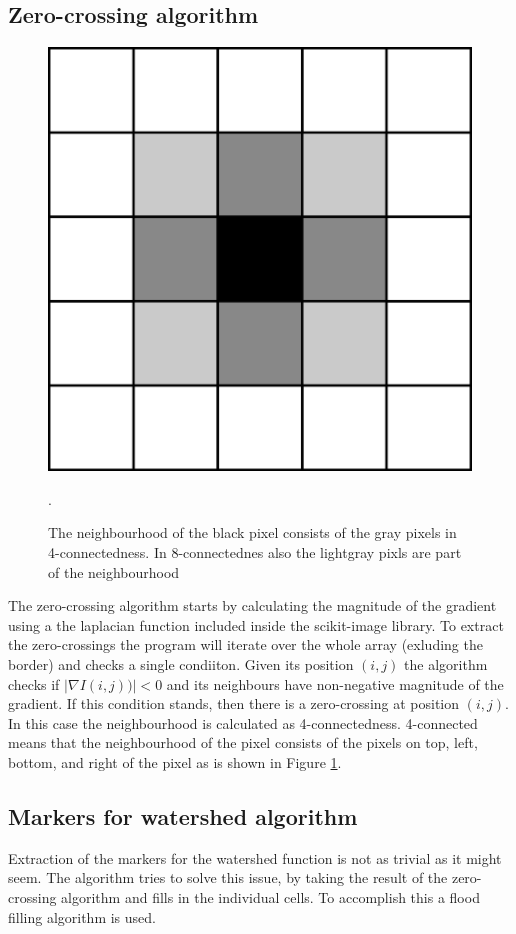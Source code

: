 \documentclass[
  digital,     %
  oneside,     %
  nosansbold,  %
  nocolorbold, %
  lof,         %
  lot,         %
]{fithesis4}
\begin{document}
\subsection{Zero-crossing algorithm}

\begin{figure}
    \begin{center}
        \includegraphics[width=0.3\linewidth]{resources/neighbourhood.png}
    \end{center}
    \caption{The neighbourhood of the black pixel consists of the gray pixels in
    4-connectedness. In 8-connectednes also the lightgray pixls are part of the
    neighbourhood}.
    \label{fig:neighbourhood}
\end{figure}

The zero-crossing algorithm starts by calculating the magnitude of the gradient
using a the laplacian function included inside the scikit-image library. To
extract the zero-crossings the program will iterate over the whole array
(exluding the border) and checks a single condiiton. Given its position $(i, j)$
the algorithm checks if $|\nabla I(i, j))| < 0$ and its neighbours have
non-negative magnitude of the gradient.  If this condition stands, then there is
a zero-crossing at position $(i, j)$. In this case the neighbourhood is
calculated as 4-connectedness. 4-connected means that the neighbourhood of the
pixel consists of the pixels on top, left, bottom, and right of the pixel as is
shown in Figure \ref{fig:neighbourhood}.

\subsection{Markers for watershed algorithm}
Extraction of the markers for the watershed function is not as trivial as it
might seem. The algorithm tries to solve this issue, by taking the result of the
zero-crossing algorithm and fills in the individual cells. To accomplish this
a flood filling algorithm is used.
\end{document}
